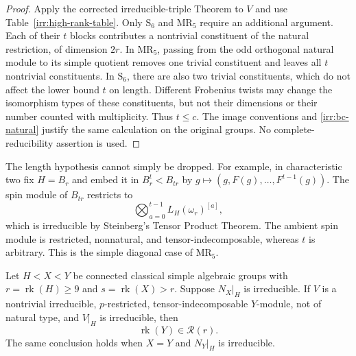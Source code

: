 \begin{proof}
Apply the corrected irreducible-triple Theorem to $V$ and use
Table~\ref{irr:high-rank-table}.  Only $\mathrm S_6$ and $\mathrm {MR}_5$
require an additional argument.  Each of their $t$ blocks contributes a
nontrivial constituent of the natural restriction, of dimension $2r$.
In $\mathrm {MR}_5$, passing from the odd orthogonal natural module to its
simple quotient removes one trivial constituent and leaves all $t$
nontrivial constituents.  In $\mathrm S_6$, there are also two trivial
constituents, which do not affect the lower bound $t$ on length.  Different
Frobenius twists may change the isomorphism types of these constituents, but
not their dimensions or their number counted with multiplicity.  Thus $t\leq c$.
The image conventions and \eqref{irr:bc-natural} justify the same calculation
on the original groups.  No complete-reducibility assertion is used.
\end{proof}

The length hypothesis cannot simply be dropped.  For example, in
characteristic two fix $H=B_r$ and embed it in $B_r^t<B_{tr}$ by
$g\mapsto(g,F(g),\ldots,F^{t-1}(g))$.  The spin module of $B_{tr}$ restricts
to
\[
 \bigotimes_{a=0}^{t-1}L_H(\omega_r)^{[a]},
\]
which is irreducible by Steinberg's Tensor Product Theorem.  The ambient
spin module is restricted, nonnatural, and tensor-indecomposable, whereas
$t$ is arbitrary.  This is the simple diagonal case of $\mathrm {MR}_5$.

\begin{lemma}
\label{irr:intervening}
Let $H<X<Y$ be connected classical simple algebraic groups with
$r=\operatorname{rk}(H)\geq9$ and $s=\operatorname{rk}(X)>r$.
Suppose $N_X|_H$ is irreducible.  If $V$ is a nontrivial irreducible,
$p$-restricted, tensor-indecomposable $Y$-module, not of natural type, and
$V|_H$ is irreducible, then
\[
 \operatorname{rk}(Y)\in\mathcal R(r).
\]
The same conclusion holds when $X=Y$ and $N_Y|_H$ is irreducible.
\end{lemma}

